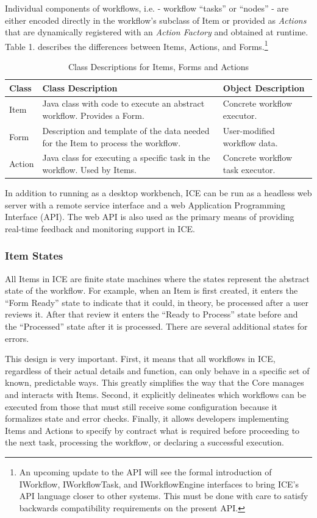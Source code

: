 Individual components of workflows, i.e. - workflow ``tasks'' or
``nodes'' - are either encoded directly in the workflow's subclass of
Item or provided as \emph{Actions} that are dynamically registered with
an \emph{Action Factory} and obtained at runtime. Table 1. describes the
differences between Items, Actions, and Forms.\footnote{An upcoming update to the API will see the formal introduction of
IWorkflow, IWorkflowTask, and IWorkflowEngine interfaces to bring ICE's
API language closer to other systems. This must be done with care to
satisfy backwards compatibility requirements on the present API.}

\begin{table}[t]
\begin{tabularx}{\textwidth}{|l|X|l|}
\hline
Class & Class Description & Object Description\tabularnewline\hline
Item & Java class with code to execute an abstract workflow. Provides a
Form. & Concrete workflow executor.\tabularnewline\hline
Form & Description and template of the data needed for the Item to
process the workflow. & User-modified workflow data.\tabularnewline\hline
Action & Java class for executing a specific task in the workflow. Used
by Items. & Concrete workflow task executor.\tabularnewline\hline
\end{tabularx}
\caption{Class Descriptions for Items, Forms and Actions}
\end{table}

In addition to running as a desktop workbench, ICE can be run as a
headless web server with a remote service interface and a web
Application Programming Interface (API). The web API is also used as the
primary means of providing real-time feedback and monitoring support in
ICE.

\subsubsection{Item States}\label{item-states}

All Items in ICE are finite state machines where the states represent
the abstract state of the workflow. For example, when an Item is first
created, it enters the ``Form Ready'' state to indicate that it could,
in theory, be processed after a user reviews it. After that review it
enters the ``Ready to Process'' state before and the ``Processed'' state
after it is processed. There are several additional states for errors.

This design is very important. First, it means that all workflows in
ICE, regardless of their actual details and function, can only behave in
a specific set of known, predictable ways. This greatly simplifies the
way that the Core manages and interacts with Items. Second, it
explicitly delineates which workflows can be executed from those that
must still receive some configuration because it formalizes state and
error checks. Finally, it allows developers implementing Items and
Actions to specify by contract what is required before proceeding to the
next task, processing the workflow, or declaring a successful execution.

